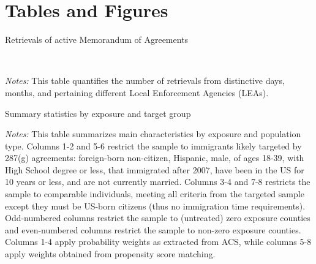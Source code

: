 \documentclass{article}
\begin{document}


\newpage
\section{Tables and Figures}

\begin{table}[h]
\centering
\caption{Retrievals of active Memorandum of Agreements}
\label{tab:retrievals}
\end{table}

\justifying
\
\begin{spacing}{1}
\begin{footnotesize}
\noindent \textit{Notes:} This table quantifies the number of retrievals from distinctive days, months, and pertaining different Local Enforcement Agencies (LEAs).
\end{footnotesize}
\end{spacing}


\newpage
\begin{landscape}
\begin{table}[h]
\centering
\caption{Summary statistics by exposure and target group}
\label{fig:timeline}
\end{table}

\justifying
\begin{spacing}{1}
\begin{footnotesize}
\noindent \textit{Notes:} This table summarizes main characteristics by exposure and population type. Columns 1-2 and 5-6 restrict the sample to immigrants likely targeted by 287(g) agreements: foreign-born non-citizen, Hispanic, male, of ages 18-39, with High School degree or less, that immigrated after 2007, have been in the US for 10 years or less, and are not currently married. Columns 3-4 and 7-8 restricts the sample to comparable individuals, meeting all criteria from the targeted sample except they must be US-born citizens (thus no immigration time requirements). Odd-numbered columns restrict the sample to (untreated) zero exposure counties and even-numbered columns restrict the sample to non-zero exposure counties. Columns 1-4 apply probability weights as extracted from ACS, while columns 5-8 apply weights obtained from propensity score matching.
\end{footnotesize}
\end{spacing}
\end{landscape}
\end{document}
